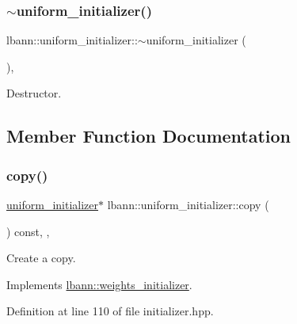 \subsubsection{\texorpdfstring{$\sim$uniform\+\_\+initializer()}{~uniform\_initializer()}}
{\footnotesize\ttfamily lbann\+::uniform\+\_\+initializer\+::$\sim$uniform\+\_\+initializer (\begin{DoxyParamCaption}{ }\end{DoxyParamCaption})\hspace{0.3cm}{\ttfamily [override]}, {\ttfamily [default]}}

Destructor. 

\subsection{Member Function Documentation}
\mbox{\label{classlbann_1_1uniform__initializer_aeff019b94438eeb847d7236d5d28cdb3}} 
\subsubsection{\texorpdfstring{copy()}{copy()}}
{\footnotesize\ttfamily \hyperlink{classlbann_1_1uniform__initializer}{uniform\+\_\+initializer}$\ast$ lbann\+::uniform\+\_\+initializer\+::copy (\begin{DoxyParamCaption}{ }\end{DoxyParamCaption}) const\hspace{0.3cm}{\ttfamily [inline]}, {\ttfamily [override]}, {\ttfamily [virtual]}}

Create a copy. 

Implements \hyperlink{classlbann_1_1weights__initializer_acc84ce49188b74b23987cef3db18525a}{lbann\+::weights\+\_\+initializer}.



Definition at line 110 of file initializer.\+hpp.


